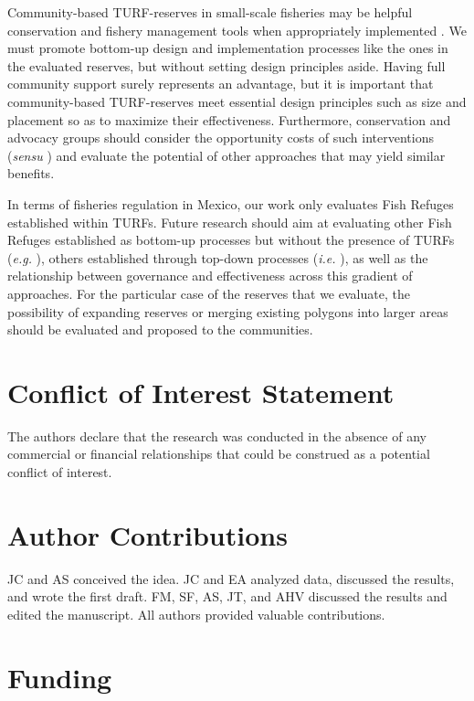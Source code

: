 \documentclass{frontiersSCNS}
\begin{document}
Community-based TURF-reserves in small-scale fisheries may be helpful conservation and fishery management tools when appropriately implemented \citep{gelcich_2015}. We must promote bottom-up design and implementation processes like the ones in the evaluated reserves, but without setting design principles aside. Having full community support surely represents an advantage, but it is important that community-based TURF-reserves meet essential design principles such as size and placement so as to maximize their effectiveness. Furthermore, conservation and advocacy groups should consider the opportunity costs of such interventions (\emph{sensu} \citet{smith_2010}) and evaluate the potential of other approaches that may yield similar benefits.

In terms of fisheries regulation in Mexico, our work only evaluates Fish Refuges established within TURFs. Future research should aim at evaluating other Fish Refuges established as bottom-up processes but without the presence of TURFs (\emph{e.g.} \citet{dof_websiteC_2012}), others established through top-down processes (\emph{i.e.} \citet{dof_websiteU_2018}), as well as the relationship between governance and effectiveness across this gradient of approaches. For the particular case of the reserves that we evaluate, the possibility of expanding reserves or merging existing polygons into larger areas should be evaluated and proposed to the communities.

\section*{Conflict of Interest Statement}

The authors declare that the research was conducted in the absence of any commercial or financial relationships that could be construed as a potential conflict of interest.

\section*{Author Contributions}

JC and AS conceived the idea. JC and EA analyzed data, discussed the results, and wrote the first draft. FM, SF, AS, JT, and AHV discussed the results and edited the manuscript. All authors provided valuable contributions.

\section*{Funding}
\end{document}
